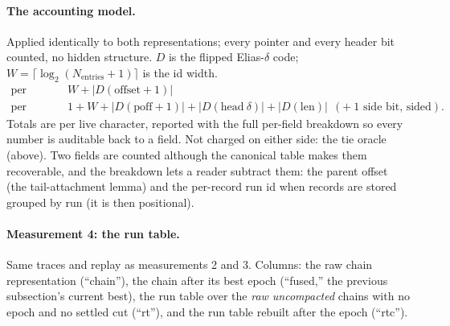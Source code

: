 \documentclass[11pt]{article}
\begin{document}
\paragraph{The accounting model.} Applied identically to both
representations; every pointer and every header bit counted, no hidden
structure. $D$ is the flipped Elias-$\delta$ code; $W = \lceil \log_2
(N_{\mathrm{entries}} + 1) \rceil$ is the id width.
\begin{align*}
  \text{per record:}&\quad W + |D(\mathrm{offset}+1)| \\
  \text{per entry:}&\quad 1 + W + |D(\mathrm{poff}+1)| +
  |D(\mathrm{head}\ \delta)| + |D(\mathrm{len})|
  \ \ (+\ 1 \text{ side bit, sided}).
\end{align*}
Totals are per live character, reported with the full per-field
breakdown so every number is auditable back to a field. Not charged on
either side: the tie oracle (above). Two fields are counted although
the canonical table makes them recoverable, and the breakdown lets a
reader subtract them: the parent offset (the tail-attachment lemma) and
the per-record run id when records are stored grouped by run (it is
then positional).

\paragraph{Measurement 4: the run table.} Same traces and replay as
measurements 2 and 3. Columns: the raw chain representation
(``chain''), the chain after its best epoch (``fused,'' the previous
subsection's current best), the run table over the \emph{raw
uncompacted} chains with no epoch and no settled cut (``rt''), and the
run table rebuilt after the epoch (``rtc'').
\end{document}
